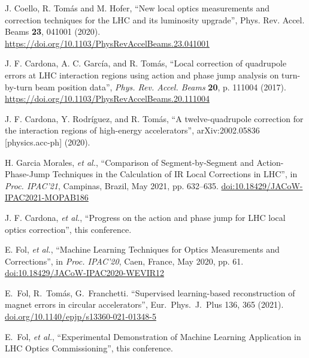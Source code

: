 \documentclass[a4paper]{cernatsnote}
\begin{document}
\begin{thebibliography}{99}

J. Coello, R. Tom\'as and M. Hofer, ``New local optics measurements and correction techniques for the LHC and its luminosity upgrade'', Phys. Rev. Accel. Beams {\bf 23}, 041001 (2020).
\url{https://doi.org/10.1103/PhysRevAccelBeams.23.041001}

 J. F.  Cardona, A. C. Garc\'ia, and R. Tom\'as, ``Local correction of quadrupole errors at LHC interaction regions using action and phase jump analysis on turn-by-turn beam position data'', {\it Phys. Rev. Accel. Beams} {\bf 20}, p. 111004 (2017).
\url{https://doi.org/10.1103/PhysRevAccelBeams.20.111004}

 J. F.  Cardona, Y. Rodr\'iguez, and R. Tom\'as, ``A twelve-quadrupole correction for the interaction regions of high-energy accelerators'',  arXiv:2002.05836 [physics.acc-ph] (2020).

   H. Garcia Morales, {\it et al.},
   \textquotedblleft{Comparison of Segment-by-Segment and Action-Phase-Jump Techniques in the Calculation of IR Local Corrections in LHC}\textquotedblright,
   in \emph{Proc. IPAC’21}, Campinas, Brazil, May 2021, pp. 632--635.
   \url{doi:10.18429/JACoW-IPAC2021-MOPAB186}  

 J. F. Cardona, {\it et al.}, ``Progress on the action and phase jump for LHC local optics correction'', this conference.


  E. Fol, {\it et al.},
   \textquotedblleft{Machine Learning Techniques for Optics Measurements and Corrections}\textquotedblright,
   in \emph{Proc. IPAC’20}, Caen, France, May 2020, pp. 61.
   \url{doi:10.18429/JACoW-IPAC2020-WEVIR12} 

 E.~Fol, R.~Tom\'as,  G.~Franchetti. ``Supervised learning-based reconstruction of magnet errors in circular accelerators'', Eur.~Phys.~J.~Plus 136, 365 (2021). \url{doi.org/10.1140/epjp/s13360-021-01348-5}

 E.~Fol, {\it et al.}, ``Experimental Demonstration of Machine Learning Application in LHC Optics Commissioning'', this conference.



\end{thebibliography}
\end{document}
